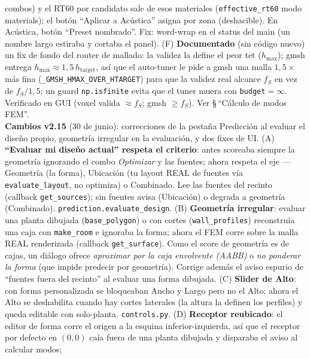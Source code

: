 \documentclass[11pt, a4paper]{article}
\begin{document}
\begin{center}
{    combos) y el RT60 por candidato sale de esos materiales
    (\texttt{effective\_rt60} modo materials); el botón ``Aplicar a Acústica''
    asigna por zona (deshacible). En Acústica, botón ``Preset nombrado''. Fix:
    word-wrap en el status del main (un nombre largo estiraba y cortaba el panel).
    (F) \textbf{Documentado} (sin código nuevo) un fix de fondo del router de
    mallado: la validez la define el peor tet ($h_\text{max}$); gmsh entrega
    $h_\text{max} \approx 1{,}5\,h_\text{target}$, así que el auto-tuner le pide a
    gmsh una malla $1{,}5\times$ más fina (\texttt{\_GMSH\_HMAX\_OVER\_HTARGET})
    para que la validez real alcance $f_S$ en vez de $f_S/1{,}5$; un guard
    \texttt{np.isfinite} evita que el tuner muera con \texttt{budget}$=\infty$.
    Verificado en GUI (voxel valida $\approx f_S$; gmsh $\geq f_S$). Ver
    \S\,``Cálculo de modos FEM''.\\[2pt]
    \textbf{Cambios v2.15} (30 de junio): correcciones de la pestaña Predicción
    al evaluar el diseño propio, geometría irregular en la evaluación, y dos
    fixes de UI.
    (A) \textbf{``Evaluar mi diseño actual'' respeta el criterio}: antes
    scoreaba siempre la geometría ignorando el combo \emph{Optimizar} y las
    fuentes; ahora respeta el eje --- Geometría (la forma), Ubicación (tu
    layout REAL de fuentes vía \texttt{evaluate\_layout}, no optimiza) o
    Combinado. Lee las fuentes del recinto (callback \texttt{get\_sources});
    sin fuentes avisa (Ubicación) o degrada a geometría (Combinado).
    \texttt{prediction.evaluate\_design}.
    (B) \textbf{Geometría irregular}: evaluar una planta dibujada
    (\texttt{base\_polygon}) o con cortes (\texttt{wall\_profiles}) reconstruía
    una caja con \texttt{make\_room} e ignoraba la forma; ahora el FEM corre
    sobre la malla REAL renderizada (callback \texttt{get\_surface}). Como el
    score de geometría es de cajas, un diálogo ofrece \emph{aproximar por la
    caja envolvente (AABB)} o \emph{no ponderar la forma} (que impide predecir
    por geometría). Corrige además el aviso espurio de ``fuentes fuera del
    recinto'' al evaluar una forma dibujada.
    (C) \textbf{Slider de Alto}: con forma personalizada se bloqueaban Ancho y
    Largo pero no el Alto; ahora el Alto se deshabilita cuando hay cortes
    laterales (la altura la definen los perfiles) y queda editable con
    solo-planta. \texttt{controls.py}.
    (D) \textbf{Receptor reubicado}: el editor de forma corre el origen a la
    esquina inferior-izquierda, así que el receptor por defecto en $(0,0)$
    caía fuera de una planta dibujada y disparaba el aviso al calcular modos;
}
\end{center}
\end{document}
